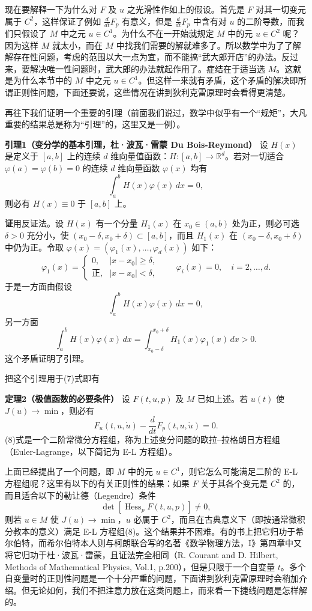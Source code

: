 现在要解释一下为什么对 $F$ 及 $u$ 之光滑性作如上的假设。首先是 $F$ 对其一切变元属于 $C^2$，这样保证了例如 $\frac d{dt}F_p$ 有意义，但是 $\frac d{dt}F_p$ 中含有对 $u$ 的二阶导数，而我们只假设了 $M$ 中之元 $u\in C^1$。为什么不在一开始就规定 $M$ 中的元 $u\in C^2$ 呢？因为这样 $M$ 就太小，而在 $M$ 中找我们需要的解就难多了。所以数学中为了了解解存在性问题，考虑的范围以大一点为宜，而不能搞“武大郎开店”的办法。反过来，要解决唯一性问题时，武大郎的办法就起作用了。症结在于适当选 $M$。这就是为什么本节中的 $M$ 中之元 $u\in C^1$。但这样一来就有矛盾，这个矛盾的解决即所谓正则性问题，下面还要说，这些情况在讲到狄利克雷原理时会看得更清楚。

再往下我们证明一个重要的引理（前面我们说过，数学中似乎有一个“规矩”，大凡重要的结果总是称为“引理”的，这里又是一例）。

\noindent\textbf{引理1（变分学的基本引理，杜·波瓦·雷蒙 Du Bois-Reymond）}\quad
设 $H(x)$ 是定义于 $[a,b]$ 上的连续 $d$ 维向量值函数：$H:[a,b]\to\mathbb R^d$。若对一切适合 $\varphi(a)=\varphi(b)=0$ 的连续 $d$ 维向量函数 $\varphi(x)$ 均有
\[
 \int_a^b H(x)\varphi(x)\,dx=0,
\]
则必有 $H(x)\equiv0$ 于 $[a,b]$ 上。

\noindent\textbf{证}\quad 用反证法。设 $H(x)$ 有一个分量 $H_1(x)$ 在 $x_0\in(a,b)$ 处为正，则必可选 $\delta>0$ 充分小，使 $(x_0-\delta,x_0+\delta)\subset[a,b]$，而且 $H_1(x)$ 在 $(x_0-\delta,x_0+\delta)$ 中仍为正。令取 $\varphi(x)=(\varphi_1(x),\ldots,\varphi_d(x))$ 如下：
\[
 \varphi_1(x)=
 \begin{cases}
 0,& |x-x_0|\ge\delta,\\
 \text{正},& |x-x_0|<\delta,
 \end{cases}
 \qquad
 \varphi_i(x)=0,\quad i=2,\ldots,d.
\]
于是一方面由假设
\[
 \int_a^b H(x)\varphi(x)\,dx=0,
\]
另一方面
\[
 \int_a^b H(x)\varphi(x)\,dx
 =\int_{x_0-\delta}^{x_0+\delta}H_1(x)\varphi_1(x)\,dx>0.
\]
这个矛盾证明了引理。

把这个引理用于(7)式即有

\noindent\textbf{定理2（极值函数的必要条件）}\quad
设 $F(t,u,p)$ 及 $M$ 已如上述。若 $u(t)$ 使 $J(u)\to\min$，则必有
\begin{equation}
 F_u(t,u,\dot u)-\frac d{dt}F_p(t,u,\dot u)=0.
 \tag{8}
\end{equation}
(8)式是一个二阶常微分方程组，称为上述变分问题的欧拉--拉格朗日方程组（Euler-Lagrange，以下简记为 E-L 方程组）。

上面已经提出了一个问题，即 $M$ 中的元 $u\in C^1$，则它怎么可能满足二阶的 E-L 方程组呢？这里有以下的有关正则性的结果：如果 $F$ 关于其各个变元是 $C^2$ 的，而且适合以下的勒让德（Legendre）条件
\[
 \det[\operatorname{Hess}_pF(t,u,p)]\ne0,
\]
则若 $u\in M$ 使 $J(u)\to\min$，$u$ 必属于 $C^2$，而且在古典意义下（即按通常微积分教本的意义）满足 E-L 方程组(8)。这个结果并不困难。有的书上把它归功于希尔伯特，而希尔伯特本人则与柯朗联合写的名著《数学物理方法，I》第四章中又将它归功于杜·波瓦·雷蒙，且证法完全相同（R. Courant and D. Hilbert, Methods of Mathematical Physics, Vol.1, p.200），但是只限于一个自变量 $t$。多个自变量时的正则性问题是一个十分严重的问题，下面讲到狄利克雷原理时会稍加介绍。但无论如何，我们不把注意力放在这类问题上，而来看一下捷线问题是怎样解的。

